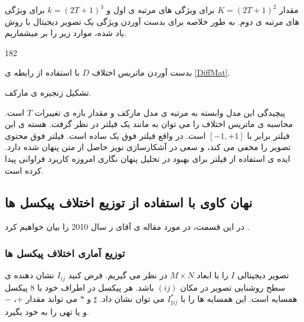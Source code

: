 مقدار $ K=(2T+1)^{2} $ برای ویژگی های مرتبه ی اول و $ k=(2T+1)^{3} $ برای ویژگی های مرتبه ی دوم. به طور خلاصه برای بدست آوردن ویژگی یک تصویر دیجیتال با روش یاد شده، موارد زیر را بر میشماریم.
\begin{dingautolist}{182}
\item
بدست آوردن ماتریس اختلاف $ D $ با استفاده از رابطه ی \ref{DiffMat}.
\item
تشکیل زنجیره ی مارکف. 
\end{dingautolist}
پیچیدگی این مدل وابسته به مرتبه ی مدل مارکف و مقدار بازه ی تغییرات $ T $ است. محاسبه ی ماتریس اختلاف را می توان به مانند یک فیلتر {} در نظر گرفت. هسته ی این فیلتر برابر با $ [-1,+1] $ است. در واقع فیلتر فوق یک {} ساده است. فیلتر فوق محتوی تصویر را مخفی می کند، و سعی در آشکارسازی نویز حاصل از متن پنهان شده دارد. ایده ی استفاده از فیلتر برای بهبود  در تحلیل پنهان نگاری امروزه کاربرد فراوانی پیدا کرده است. 

\subsection{نهان کاوی با استفاده از توزیع اختلاف پیکسل ها}
در این قسمت، در مورد مقاله ی آقای  ر سال 2010 را بیان خواهیم کرد \cite{Zhang2010_Detection}. 

\subsubsection{توزیع آماری اختلاف پیکسل ها}

تصویر دیجیتالی $ I $ را با ابعاد $ M\times N$ در نظر می گیریم. فرض کنید $ I_{ij} $ نشان دهنده ی سطح روشنایی تصویر در مکان $ (ij) $ باشد. هر پیکسل در اطراف خود با 8 پیکسل همسایه است. این همسایه ها را با $ I_{\sharp ij}^{*} $ می توان نشان داد.
{  $ \sharp $ } و {$ * $} می تواند مقدار $ + $، $ - $ و یا تهی را به خود بگیرد. 

